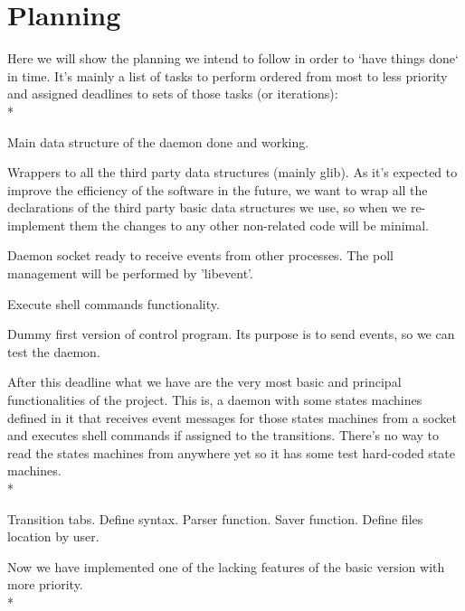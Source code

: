 \documentclass[a4paper,11pt]{scrartcl}
\begin{document}
\section{Planning}
Here we will show the planning we intend to follow in order to `have things 
done` in time. It's mainly a list of tasks to perform ordered from most to less 
priority and assigned deadlines to sets of those tasks (or iterations):\\*
\\
\begin{list}{-}{February 16th, 2012}
  \item Main data structure of the daemon done and working.
  \item Wrappers to all the third party data structures (mainly glib).
    \subitem As it's expected to improve the efficiency of the software in the 
	      future, we want to wrap all the declarations of the third 
	      party basic data structures we use, so when we re-implement them
	      the changes to any other non-related code will be minimal.
  \item Daemon socket ready to receive events from other processes.
    \subitem The poll management will be performed by 'libevent'.
  \item Execute shell commands functionality.
  \item Dummy first version of control program.
    \subitem Its purpose is to send events, so we can test the daemon.
\end{list}
After this deadline what we have are the very most basic and principal 
functionalities of the project. This is, a daemon with some states machines 
defined in it that receives event messages for those states machines from a 
socket and executes shell commands if assigned to the transitions.
There's no way to read the states machines from anywhere yet so it has some test 
hard-coded state machines.\\*
\\
\begin{list}{-}{February 29th, 2012}
  \item Transition tabs. %
    \subitem Define syntax.
    \subitem Parser function.
    \subitem Saver function.
    \subitem Define files location by user.
\end{list}
Now we have implemented one of the lacking features of the basic version with 
more priority.\\*
\\
\end{document}
